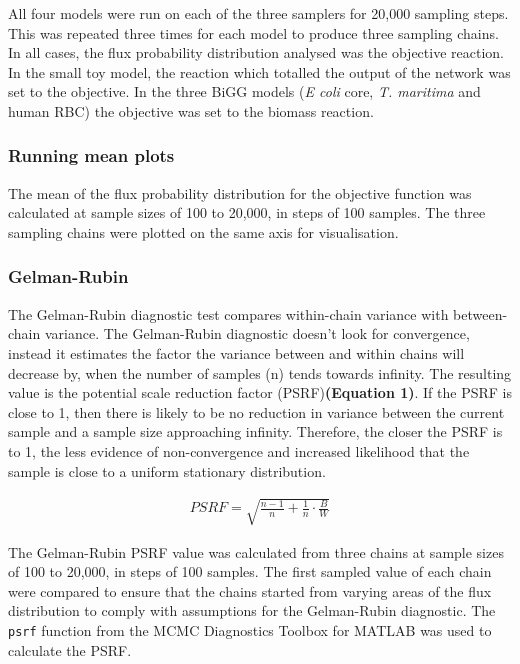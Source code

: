 \documentclass[10pt,letterpaper]{article}
\begin{document}
All four models were run on each of the three samplers for 20,000 sampling steps. This was repeated three times for each model to produce three sampling chains. In all cases, the flux probability distribution analysed was the objective reaction. In the small toy model, the reaction which totalled the output of the network was set to the objective. In the three BiGG models (\textit{E coli} core, \textit{T. maritima} and human RBC) the objective was set to the biomass reaction.

\subsubsection*{Running mean plots}
The mean of the flux probability distribution for the objective function was calculated at sample sizes of 100 to 20,000, in steps of 100 samples. The three sampling chains were plotted on the same axis for visualisation.

\subsubsection*{Gelman-Rubin}
The Gelman-Rubin diagnostic test compares within-chain variance with between-chain variance. The Gelman-Rubin diagnostic doesn’t look for convergence, instead it estimates the factor the variance between and within chains will decrease by, when the number of samples (n) tends towards infinity\cite{Sinharay}.
The resulting value is the potential scale reduction factor (PSRF)\textbf{(Equation 1)}. If the PSRF is close to 1, then there is likely to be no reduction in variance between the current sample and a sample size approaching infinity. Therefore, the closer the PSRF is to 1, the less evidence of non-convergence and increased likelihood that the sample is close to a uniform stationary distribution\cite{Brooks}.

\begin{eqnarray}
\label{eq:test}
PSRF = \sqrt{\frac{n-1}{n} + \frac{1}{n} \cdot \frac{B}{W}}
\end{eqnarray}

The Gelman-Rubin PSRF value was calculated from three chains at sample sizes of 100 to 20,000, in steps of 100 samples. The first sampled value of each chain were compared to ensure that the chains started from varying areas of the flux distribution to comply with assumptions for the Gelman-Rubin diagnostic\cite{Brooks}. The \texttt{psrf} function from the MCMC Diagnostics Toolbox for MATLAB was used to calculate the PSRF\cite{mcmcdiag}.
\end{document}
